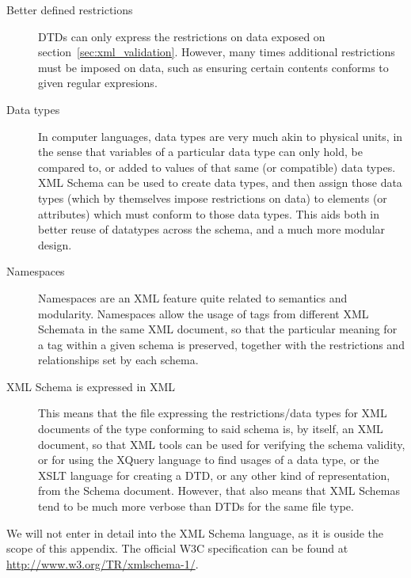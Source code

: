 		\begin{description}
			\item[Better defined restrictions] DTDs can only
			express the restrictions on data exposed on
			section~\ref{sec:xml_validation}. However, many times
			additional restrictions must be imposed on data, such
			as ensuring certain contents conforms to given regular
			expresions.
			
			 \item[Data types] In computer languages, data types
			are very much akin to physical units, in the sense that
			variables of a particular data type can only hold, be
			compared to, or added to values of that same (or
			compatible) data types. XML Schema can be used to
			create data types, and then assign those data types
			(which by themselves impose restrictions on data) to
			elements (or attributes) which must conform to those
			data types. This aids both in better reuse of datatypes
			across the schema, and a much more modular design.
			
			 \item[Namespaces] Namespaces are an XML feature quite
			related to semantics and modularity. Namespaces allow
			the usage of tags from different XML Schemata in the
			same XML document, so that the particular meaning for a
			tag within a given schema is preserved, together with
			the restrictions and relationships set by each schema.
			
			 \item[XML Schema is expressed in XML] This means that
			the file expressing the restrictions/data types for XML
			documents of the type conforming to said schema is, by
			itself, an XML document, so that XML tools can be used
			for verifying the schema validity, or for using the
			XQuery language to find usages of a data type, or the
			XSLT language for creating a DTD, or any other kind of
			representation, from the Schema document. However, that
			also means that XML Schemas tend to be much more
			verbose than DTDs for the same file type.
		\end{description}
		
		We will not enter in detail into the XML Schema language,
		as it is ouside the scope of this appendix. The official
		W3C specification can be found at
		\url{http://www.w3.org/TR/xmlschema-1/}.
		
	
